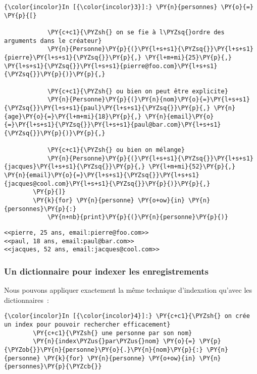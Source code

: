     \begin{Verbatim}[commandchars=\\\{\}]
{\color{incolor}In [{\color{incolor}3}]:} \PY{n}{personnes} \PY{o}{=} \PY{p}{[}
        
            \PY{c+c1}{\PYZsh{} on se fie à l\PYZsq{}ordre des arguments dans le créateur}
            \PY{n}{Personne}\PY{p}{(}\PY{l+s+s1}{\PYZsq{}}\PY{l+s+s1}{pierre}\PY{l+s+s1}{\PYZsq{}}\PY{p}{,} \PY{l+m+mi}{25}\PY{p}{,} \PY{l+s+s1}{\PYZsq{}}\PY{l+s+s1}{pierre@foo.com}\PY{l+s+s1}{\PYZsq{}}\PY{p}{)}\PY{p}{,}
        
            \PY{c+c1}{\PYZsh{} ou bien on peut être explicite}
            \PY{n}{Personne}\PY{p}{(}\PY{n}{nom}\PY{o}{=}\PY{l+s+s1}{\PYZsq{}}\PY{l+s+s1}{paul}\PY{l+s+s1}{\PYZsq{}}\PY{p}{,} \PY{n}{age}\PY{o}{=}\PY{l+m+mi}{18}\PY{p}{,} \PY{n}{email}\PY{o}{=}\PY{l+s+s1}{\PYZsq{}}\PY{l+s+s1}{paul@bar.com}\PY{l+s+s1}{\PYZsq{}}\PY{p}{)}\PY{p}{,}
        
            \PY{c+c1}{\PYZsh{} ou bien on mélange}
            \PY{n}{Personne}\PY{p}{(}\PY{l+s+s1}{\PYZsq{}}\PY{l+s+s1}{jacques}\PY{l+s+s1}{\PYZsq{}}\PY{p}{,} \PY{l+m+mi}{52}\PY{p}{,} \PY{n}{email}\PY{o}{=}\PY{l+s+s1}{\PYZsq{}}\PY{l+s+s1}{jacques@cool.com}\PY{l+s+s1}{\PYZsq{}}\PY{p}{)}\PY{p}{,}
        \PY{p}{]}
        \PY{k}{for} \PY{n}{personne} \PY{o+ow}{in} \PY{n}{personnes}\PY{p}{:}
            \PY{n+nb}{print}\PY{p}{(}\PY{n}{personne}\PY{p}{)}
\end{Verbatim}


    \begin{Verbatim}[commandchars=\\\{\}]
<<pierre, 25 ans, email:pierre@foo.com>>
<<paul, 18 ans, email:paul@bar.com>>
<<jacques, 52 ans, email:jacques@cool.com>>

    \end{Verbatim}

    \hypertarget{un-dictionnaire-pour-indexer-les-enregistrements}{%
\subsubsection{Un dictionnaire pour indexer les
enregistrements}\label{un-dictionnaire-pour-indexer-les-enregistrements}}

    Nous pouvons appliquer exactement la même technique d'indexation qu'avec
les dictionnaires~:

    \begin{Verbatim}[commandchars=\\\{\}]
{\color{incolor}In [{\color{incolor}4}]:} \PY{c+c1}{\PYZsh{} on crée un index pour pouvoir rechercher efficacement}
        \PY{c+c1}{\PYZsh{} une personne par son nom}
        \PY{n}{index\PYZus{}par\PYZus{}nom} \PY{o}{=} \PY{p}{\PYZob{}}\PY{n}{personne}\PY{o}{.}\PY{n}{nom}\PY{p}{:} \PY{n}{personne} \PY{k}{for} \PY{n}{personne} \PY{o+ow}{in} \PY{n}{personnes}\PY{p}{\PYZcb{}}
\end{Verbatim}


